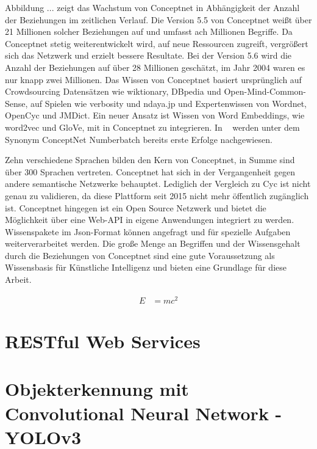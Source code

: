 Abbildung ... zeigt das Wachstum von Conceptnet in Abhängigkeit der Anzahl der Beziehungen im zeitlichen Verlauf. Die Version 5.5 von Conceptnet weißt über 21 Millionen solcher Beziehungen auf und umfasst ach Millionen Begriffe. Da Conceptnet stetig weiterentwickelt wird, auf neue Ressourcen zugreift, vergrößert sich das Netzwerk und erzielt bessere Resultate. Bei der Version 5.6 wird die Anzahl der Beziehungen auf über 28 Millionen geschätzt, im Jahr 2004 waren es nur knapp zwei Millionen. 
Das Wissen von Conceptnet basiert ursprünglich auf Crowdsourcing Datensätzen wie wiktionary, DBpedia und Open-Mind-Common-Sense, auf Spielen wie verbosity und ndaya.jp und Expertenwissen von Wordnet, OpenCyc und JMDict. Ein neuer Ansatz ist Wissen von Word Embeddings, wie word2vec und GloVe, mit in Conceptnet zu integrieren. In ~\cite{speer2017conceptnet} werden unter dem Synonym ConceptNet Numberbatch bereits erste Erfolge nachgewiesen.

Zehn verschiedene Sprachen bilden den Kern von Conceptnet, in Summe sind über 300 Sprachen vertreten. Conceptnet hat sich in der Vergangenheit gegen andere semantische Netzwerke behauptet. Lediglich der Vergleich zu Cyc ist nicht genau zu validieren, da diese Plattform seit 2015 nicht mehr öffentlich zugänglich ist. Conceptnet hingegen ist ein Open Source Netzwerk und bietet die Möglichkeit über eine Web-API in eigene Anwendungen integriert zu werden. Wissenspakete im Json-Format können angefragt und für spezielle Aufgaben weiterverarbeitet werden. 
Die große Menge an Begriffen und der Wissensgehalt durch die Beziehungen von Conceptnet sind eine gute Voraussetzung als Wissensbasis für Künstliche Intelligenz und bieten eine Grundlage für diese Arbeit. 
\cite{liu2004conceptnet}
\cite{havasi2007conceptnet}
\cite{speer2013conceptnet}
\cite{speer2017conceptnet} 

\begin{align}
E &= mc^2
\end{align}






\section{RESTful Web Services}
\label{sec:cn}



\section{Objekterkennung mit Convolutional Neural Network - YOLOv3}
\label{sec:cn}

